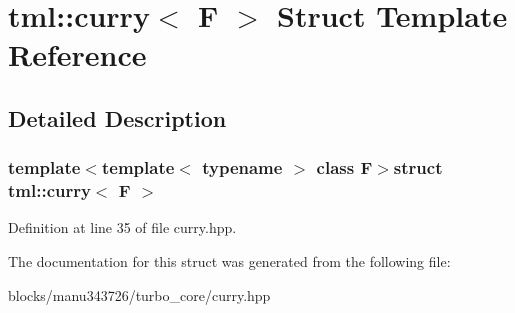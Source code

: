 \hypertarget{structtml_1_1curry}{\section{tml\+:\+:curry$<$ F $>$ Struct Template Reference}
\label{structtml_1_1curry}
}


\subsection{Detailed Description}
\subsubsection*{template$<$template$<$ typename $>$ class F$>$struct tml\+::curry$<$ F $>$}



Definition at line 35 of file curry.\+hpp.



The documentation for this struct was generated from the following file\+:\begin{DoxyCompactItemize}
\item 
blocks/manu343726/turbo\+\_\+core/curry.\+hpp\end{DoxyCompactItemize}
